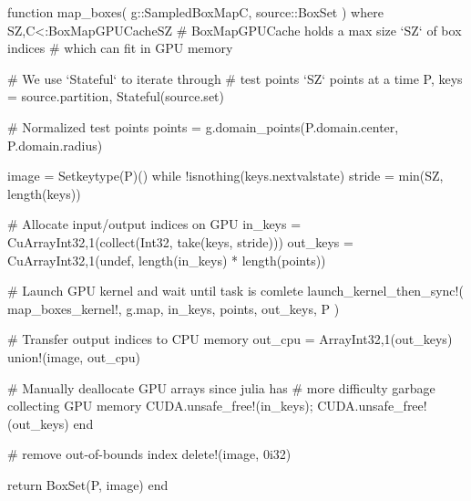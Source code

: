 \begin{jllisting}[float, floatplacement=hb!, language=julia, style=jlcodestyle, label=lst:boxmap_gpu, caption=Function to calculate $f(\mathcal{B})$ with GPU acceleration]
    function map_boxes(
            g::SampledBoxMap{C}, source::BoxSet
        ) where {SZ,C<:BoxMapGPUCache{SZ}}
        # BoxMapGPUCache holds a max size `SZ` of box indices 
        # which can fit in GPU memory

        # We use `Stateful` to iterate through
        # test points `SZ` points at a time
        P, keys = source.partition, Stateful(source.set)

        # Normalized test points
        points = g.domain_points(P.domain.center, P.domain.radius)

        image = Set{keytype(P)}()
        while !isnothing(keys.nextvalstate)
            stride = min(SZ, length(keys))

            # Allocate input/output indices on GPU
            in_keys = CuArray{Int32,1}(collect(Int32, take(keys, stride)))
            out_keys = CuArray{Int32,1}(undef, length(in_keys) * length(points))

            # Launch GPU kernel and wait until task is comlete
            launch_kernel_then_sync!(
                map_boxes_kernel!, 
                g.map, in_keys, points, out_keys, P
            )
            
            # Transfer output indices to CPU memory
            out_cpu = Array{Int32,1}(out_keys)
            union!(image, out_cpu)

            # Manually deallocate GPU arrays since julia has 
            # more difficulty garbage collecting GPU memory
            CUDA.unsafe_free!(in_keys); CUDA.unsafe_free!(out_keys)
        end

        # remove out-of-bounds index
        delete!(image, 0i32)

        return BoxSet(P, image)
    end
\end{jllisting}

\clearpage


